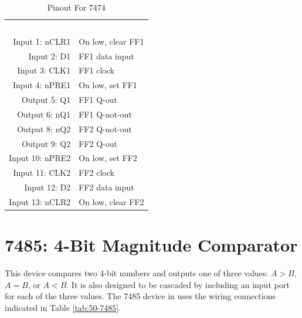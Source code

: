 \begin{table}[H]
	\sffamily
	\newcommand{\head}[1]{\textcolor{white}{\textbf{#1}}}		
	\begin{center}
		\begin{tabular}{rl} 
			\rowcolor{black!75}
			\head{Logisim Label} & \head{Function} \\
			Input 1: nCLR1  & On low, clear FF1 \\
			Input 2: D1     & FF1 data input    \\
			Input 3: CLK1   & FF1 clock         \\
			Input 4: nPRE1  & On low, set FF1   \\
			Output 5: Q1    & FF1 Q-out         \\
			Output 6: nQ1   & FF1 Q-not-out     \\
			Output 8: nQ2   & FF2 Q-not-out     \\
			Output 9: Q2    & FF2 Q-out         \\
			Input 10: nPRE2 & On low, set FF2   \\
			Input 11: CLK2  & FF2 clock         \\
			Input 12: D2    & FF2 data input    \\
			Input 13: nCLR2 & On low, clear FF2 \\
		\end{tabular}
	\end{center}
	\caption{Pinout For 7474}
	\label{tab:50-7474}
\end{table}

\section{7485: 4-Bit Magnitude Comparator}

This device compares two 4-bit numbers and outputs one of three values: $ A>B $, $ A=B $, or $ A<B $. It is also designed to be cascaded by including an input port for each of the three values. The 7485 device in \LE uses the wiring connections indicated in Table \ref{tab:50-7485}.

